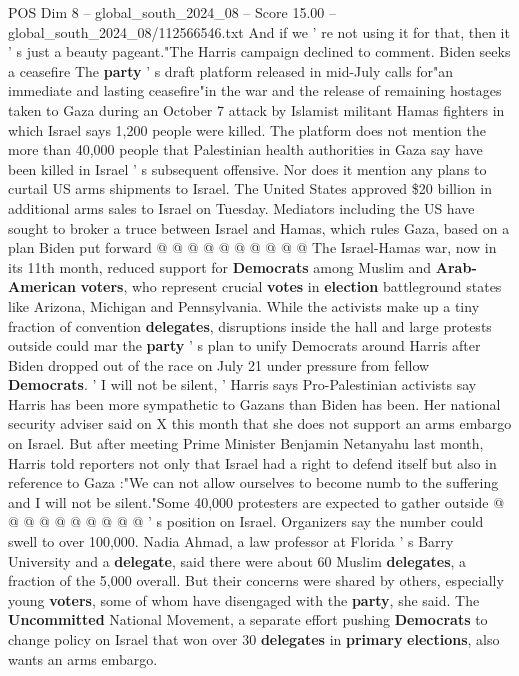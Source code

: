 \begin{textsample}{POS Dim 8 – global\_south\_2024\_08 – Score 15.00 – global\_south\_2024\_08/112566546.txt}
And if we ' re not using it for that, then it ' s just a beauty pageant."The Harris campaign declined to comment.
Biden seeks a ceasefire The \textbf{party} ' s draft platform released in mid-July calls for"an immediate and lasting ceasefire"in the war and the release of remaining hostages taken to Gaza during an October 7 attack by Islamist militant Hamas fighters in which Israel says 1,200 people were killed.
The platform does not mention the more than 40,000 people that Palestinian health authorities in Gaza say have been killed in Israel ' s subsequent offensive.
Nor does it mention any plans to curtail US arms shipments to Israel.
The United States approved \$20 billion in additional arms sales to Israel on Tuesday.
Mediators including the US have sought to broker a truce between Israel and Hamas, which rules Gaza, based on a plan Biden put forward @ @ @ @ @ @ @ @ @ @ The Israel-Hamas war, now in its 11th month, reduced support for \textbf{Democrats} among Muslim and \textbf{Arab-American} \textbf{voters}, who represent crucial \textbf{votes} in \textbf{election} battleground states like Arizona, Michigan and Pennsylvania.
While the activists make up a tiny fraction of convention \textbf{delegates}, disruptions inside the hall and large protests outside could mar the \textbf{party} ' s plan to unify Democrats around Harris after Biden dropped out of the race on July 21 under pressure from fellow \textbf{Democrats}. ' I will not be silent, ' Harris says Pro-Palestinian activists say Harris has been more sympathetic to Gazans than Biden has been.
Her national security adviser said on X this month that she does not support an arms embargo on Israel.
But after meeting Prime Minister Benjamin Netanyahu last month, Harris told reporters not only that Israel had a right to defend itself but also in reference to Gaza :"We can not allow ourselves to become numb to the suffering and I will not be silent."Some 40,000 protesters are expected to gather outside @ @ @ @ @ @ @ @ @ @ ' s position on Israel.
Organizers say the number could swell to over 100,000.
Nadia Ahmad, a law professor at Florida ' s Barry University and a \textbf{delegate}, said there were about 60 Muslim \textbf{delegates}, a fraction of the 5,000 overall.
But their concerns were shared by others, especially young \textbf{voters}, some of whom have disengaged with the \textbf{party}, she said.
The \textbf{Uncommitted} National Movement, a separate effort pushing \textbf{Democrats} to change policy on Israel that won over 30 \textbf{delegates} in \textbf{primary} \textbf{elections}, also wants an arms embargo.

\end{textsample}
